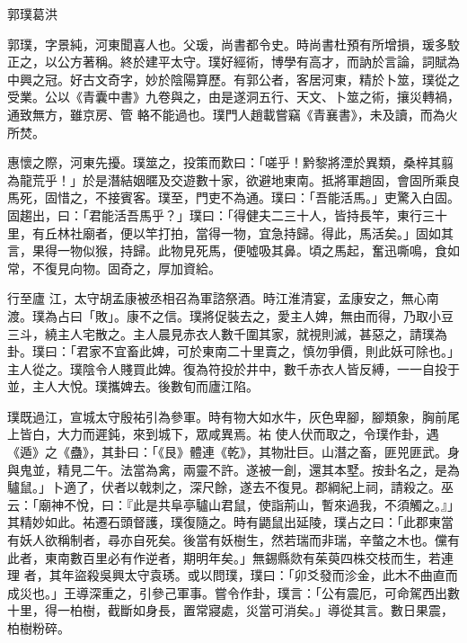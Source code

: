 
\begin{pinyinscope}

 郭璞葛洪



 郭璞，字景純，河東聞喜人也。父瑗，尚書都令史。時尚書杜預有所增損，瑗多駮正之，以公方著稱。終於建平太守。璞好經術，博學有高才，而訥於言論，詞賦為中興之冠。好古文奇字，妙於陰陽算歷。有郭公者，客居河東，精於卜筮，璞從之受業。公以《青囊中書》九卷與之，由是遂洞五行、天文、卜筮之術，攘災轉禍，通致無方，雖京房、管
 輅不能過也。璞門人趙載嘗竊《青襄書》，未及讀，而為火所焚。



 惠懷之際，河東先擾。璞筮之，投策而歎曰：「嗟乎！黔黎將湮於異類，桑梓其翦為龍荒乎！」於是潛結姻暱及交遊數十家，欲避地東南。抵將軍趙固，會固所乘良馬死，固惜之，不接賓客。璞至，門吏不為通。璞曰：「吾能活馬。」吏驚入白固。固趨出，曰：「君能活吾馬乎？」璞曰：「得健夫二三十人，皆持長竿，東行三十里，有丘林社廟者，便以竿打拍，當得一物，宜急持歸。得此，馬活矣。」固如其言，果得一物似猴，持歸。此物見死馬，便噓吸其鼻。頃之馬起，奮迅嘶鳴，食如常，不復見向物。固奇之，厚加資給。



 行至廬
 江，太守胡孟康被丞相召為軍諮祭酒。時江淮清宴，孟康安之，無心南渡。璞為占曰「敗」。康不之信。璞將促裝去之，愛主人婢，無由而得，乃取小豆三斗，繞主人宅散之。主人晨見赤衣人數千圍其家，就視則滅，甚惡之，請璞為卦。璞曰：「君家不宜畜此婢，可於東南二十里賣之，慎勿爭價，則此妖可除也。」主人從之。璞陰令人賤買此婢。復為符投於井中，數千赤衣人皆反縛，一一自投于並，主人大悅。璞攜婢去。後數旬而廬江陷。



 璞既過江，宣城太守殷祐引為參軍。時有物大如水牛，灰色卑腳，腳類象，胸前尾上皆白，大力而遲鈍，來到城下，眾咸異焉。祐
 使人伏而取之，令璞作卦，遇《遁》之《蠱》，其卦曰：「《艮》體連《乾》，其物壯巨。山潛之畜，匪兕匪武。身與鬼並，精見二午。法當為禽，兩靈不許。遂被一創，還其本墅。按卦名之，是為驢鼠。」卜適了，伏者以戟刺之，深尺餘，遂去不復見。郡綱紀上祠，請殺之。巫云：「廟神不悅，曰：『此是共阜亭驢山君鼠，使詣荊山，暫來過我，不須觸之。』」其精妙如此。祐遷石頭督護，璞復隨之。時有鼯鼠出延陵，璞占之曰：「此郡東當有妖人欲稱制者，尋亦自死矣。後當有妖樹生，然若瑞而非瑞，辛螫之木也。儻有此者，東南數百里必有作逆者，期明年矣。」無錫縣欻有茱萸四株交枝而生，若連理
 者，其年盜殺吳興太守袁琇。或以問璞，璞曰：「卯爻發而沴金，此木不曲直而成災也。」王導深重之，引參己軍事。嘗令作卦，璞言：「公有震厄，可命駕西出數十里，得一柏樹，截斷如身長，置常寢處，災當可消矣。」導從其言。數日果震，柏樹粉碎。




\end{pinyinscope}
